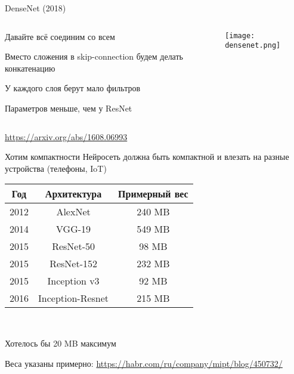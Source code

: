 \documentclass[notes,12pt, aspectratio=169]{beamer}
\newenvironment{wideitemize}{\itemize\addtolength{\itemsep}{10pt}}{\enditemize}
\begin{document}
\begin{frame}{DenseNet  (2018)}
	\begin{columns}[T] %
		\begin{column}{.5\textwidth}
			\begin{wideitemize}
				\item Давайте всё соединим со всем
				\item Вместо сложения в skip-connection будем делать конкатенацию
				\item У каждого слоя берут мало фильтров
				\item Параметров меньше, чем у ResNet
			\end{wideitemize} 
		\end{column}%
		\hfill%
		\begin{column}{.5\textwidth}
			\centering 	\texttt{[image: densenet.png]} 
		\end{column}%
	\end{columns}
	\vfill %
	\footnotesize
	\color{blue} \url{https://arxiv.org/abs/1608.06993}
\end{frame}


\begin{frame}{Хотим компактности}
Нейросеть должна быть компактной и влезать на разные устройства (телефоны, IoT)

\begin{center}
	\begin{tabular}{|c|c|c|}
		\hline
	     Год & Архитектура & Примерный вес  \\ 
		\hline 
		2012 & AlexNet & 240 MB  \\ 
		\hline 
		2014 & VGG-19 & 549 MB  \\ 
		\hline 
		2015 & ResNet-50  & 98 MB \\ 
		\hline 
		2015 & ResNet-152  & 232 MB \\ 
		\hline 
		2015 & Inception v3  & 92 MB \\ 
		\hline 
		2016 & Inception-Resnet  & 215 MB  \\ 
		\hline 
	\end{tabular} 
	
	\par \mbox{ } \par
	
	\alert{Хотелось бы 20 MB максимум} 
\end{center} 
\vfill %
\footnotesize Веса указаны примерно:
\color{blue} \url{https://habr.com/ru/company/mipt/blog/450732/}
\end{frame}
\end{document}
